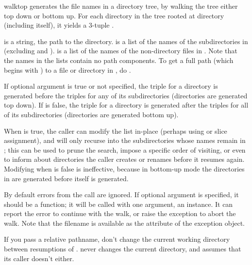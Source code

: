 \begin{funcdesc}{walk}{top}
 generates the file names in a directory tree, by
walking the tree either top down or bottom up.
For each directory in the tree rooted at directory  (including
 itself), it yields a 3-tuple
.

 is a string, the path to the directory.   is
a list of the names of the subdirectories in 
(excluding  and ).   is a list of
the names of the non-directory files in .  Note that the
names in the lists contain no path components.  To get a full
path (which begins with ) to a file or directory in
, do .

If optional argument  is true or not specified, the triple
for a directory is generated before the triples for any of its
subdirectories (directories are generated top down).  If  is
false, the triple for a directory is generated after the triples for all
of its subdirectories (directories are generated bottom up).

When  is true, the caller can modify the  list
in-place (perhaps using  or slice assignment), and
 will only recurse into the subdirectories whose names
remain in ; this can be used to prune the search,
impose a specific order of visiting, or even to inform 
about directories the caller creates or renames before it resumes
 again.  Modifying  when  is
false is ineffective, because in bottom-up mode the directories in
 are generated before  itself is generated.

By default errors from the  call are ignored.  If
optional argument  is specified, it should be a function;
it will be called with one argument, an  instance.  It can
report the error to continue with the walk, or raise the exception
to abort the walk.  Note that the filename is available as the
 attribute of the exception object.

\begin{notice}
If you pass a relative pathname, don't change the current working
directory between resumptions of .  
never changes the current directory, and assumes that its caller
doesn't either.
\end{notice}


\end{funcdesc}
